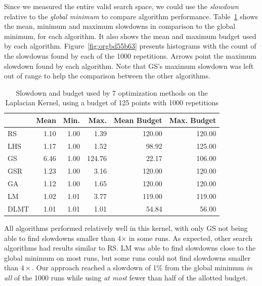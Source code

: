 \documentclass[conference]{IEEEtran}
\begin{document}
Since  we measured  the entire  valid search  space, we  could use  the \emph{slowdown}
relative   to   the   \emph{global   minimum}   to   compare   algorithm   performance.
Table~\ref{tab:gpu_laplacian_compare_budget}  shows the  mean, minimum  and maximum
slowdowns in comparison to the global minimum, for each algorithm. It also shows
the     mean    and     maximum     budget    used     by    each     algorithm.
Figure~\ref{fig:orgbd55b63} presents histograms with the count
of the slowdowns found by each of the 1000 repetitions. Arrows point the maximum
slowdown found by  each algorithm. Note that GS's maximum  slowdown was left out
of range to help the comparison between the other algorithms.

\begin{table}[b]
\centering
\caption{Slowdown and budget used by 7 optimization methods on the Laplacian Kernel, using a budget of 125 points with 1000 repetitions}
\label{tab:gpu_laplacian_compare_budget}
\begingroup\footnotesize
\begin{tabular}{lrrrrr}
  \toprule
 & Mean & Min. & Max. & Mean Budget & Max. Budget \\
  \midrule
RS & 1.10 & 1.00 & 1.39 & 120.00 & 120.00 \\
  LHS & 1.17 & 1.00 & 1.52 & 98.92 & 125.00 \\
  GS & 6.46 & 1.00 & 124.76 & 22.17 & 106.00 \\
  GSR & 1.23 & 1.00 & 3.16 & 120.00 & 120.00 \\
  GA & 1.12 & 1.00 & 1.65 & 120.00 & 120.00 \\
  LM & 1.02 & 1.01 & 3.77 & 119.00 & 119.00 \\
   \rowcolor{red!25}DLMT & 1.01 & 1.01 & 1.01 & 54.84 & 56.00 \\
   \bottomrule
\end{tabular}
\endgroup
\end{table}

All algorithms performed relatively well in  this kernel, with only GS not being
able to find slowdowns smaller than 4\(\times\) in some runs. As expected, other search
algorithms had results similar to RS. LM was able to find slowdowns close to the
global minimum on most runs, but some runs could not find slowdowns smaller than
\(4\times\). Our approach  reached a slowdown of  1\% from the global minimum  \emph{in all} of
the 1000 runs while using \emph{at most} fewer than half of the allotted budget.
\end{document}
